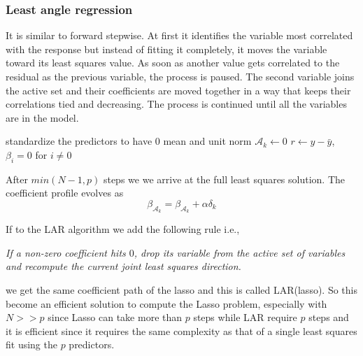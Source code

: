 \documentclass[12pt, letterpaper]{article}
\theoremstyle{definition}
\begin{document}
\subsubsection{Least angle regression}
It is similar to forward stepwise. At first it identifies the variable most correlated with the response but instead of fitting it completely, it moves the variable toward its least squares value. As soon as another value gets correlated to the residual as the previous variable, the process is paused. The second variable joins the active set and their coefficients are moved together in a way that keeps their correlations tied and decreasing. The process is continued until all the variables are in the model.
\begin{algorithm}[!ht]
standardize the predictors to have $0$ mean and unit norm\;
$\mathcal{A}_k\leftarrow 0$\;
$r\leftarrow y-\bar{y}$, $\beta_i=0$ for $i\ne0$\;
\end{algorithm}
After $min(N-1,p)$ steps we we arrive at the full least squares solution.
The coefficient profile evolves as
\begin{equation}
\beta_{\mathcal{A}_k} =  \beta_{\mathcal{A}_k} + \alpha \delta_k
\end{equation}

If to the LAR algorithm we add the following rule i.e.,

\textit{If a non-zero coefficient hits $0$, drop its variable from the active set of variables and recompute the current joint least squares direction.}

we get the same coefficient path of the lasso and this is called LAR(lasso). So this become an efficient solution to compute the Lasso problem, especially with $N>>p$ since Lasso can take more than $p$ steps while LAR require $p$ steps and it is efficient since it requires the same complexity as that of a single least squares fit using the $p$ predictors.
\end{document}
